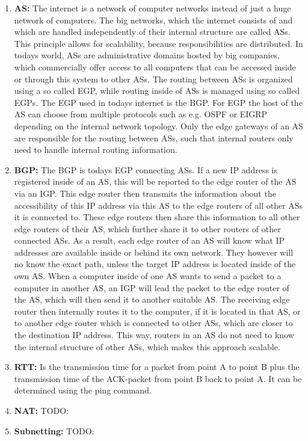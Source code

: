 \begin{enumerate}
            .
      \item \textbf{\ac{AS}:} The internet is a network of computer networks instead of just a huge network of computers. The big networks, which the internet consists of and which are handled independently of their internal structure are called \acp{AS}. This principle allows for scalability, because responsibilities are distributed. In todays world, \acp{AS} are administrative domains hosted by big companies, which commercially offer access to all computers that can be accessed inside or through this system to other \acp{AS}. The routing between \acp{AS} is organized using a so called \ac{EGP}, while routing inside of \acp{AS} is managed using so called \ac{EGP}s. The \ac{EGP} used in todays internet is the \ac{BGP}. For \ac{EGP} the host of the \ac{AS} can choose from multiple protocols such as e.g. \ac{OSPF} or \ac{EIGRP} depending on the internal network topology. Only the edge gateways of an \ac{AS} are responsible for the routing between \acp{AS}, such that internal routers only need to handle internal routing information.
      \item \textbf{\acf{BGP}:} The \ac{BGP} is todays \acs{EGP} connecting \acp{AS}. If a new IP address is registered inside of an \ac{AS}, this will be reported to the edge router of the \ac{AS} via an \ac{IGP}. This edge router then transmits the information about the accessibility of this IP address via this \ac{AS} to the edge routers of all other \acp{AS} it is connected to. These edge routers then share this information to all other edge routers of their \ac{AS}, which further share it to other routers of other connected \acp{AS}. As a result, each edge router of an \ac{AS} will know what IP addresses are available inside or behind its own network. They however will no know the exact path, unless the target IP address is located inside of the own \ac{AS}. When a computer inside of one \ac{AS} wants to send a packet to a computer in another \ac{AS}, an \ac{IGP} will lead the packet to the edge router of the \ac{AS}, which will then send it to another suitable \ac{AS}. The receiving edge router then internally routes it to the computer, if it is located in that \ac{AS}, or to another edge router which is connected to other \acp{AS}, which are closer to the destination IP address. This way, routers in an \ac{AS} do not need to know the internal structure of other \acp{AS}, which makes this approach scalable.
      \item \textbf{\acf{RTT}:} Is the transmission time for a packet from point A to point B plus the transmission time of the ACK-packet from point B back to point A. It can be determined using the ping command.
      \item \textbf{\acf{NAT}:} TODO:
      \item \textbf{Subnetting:} TODO:
\end{enumerate}

